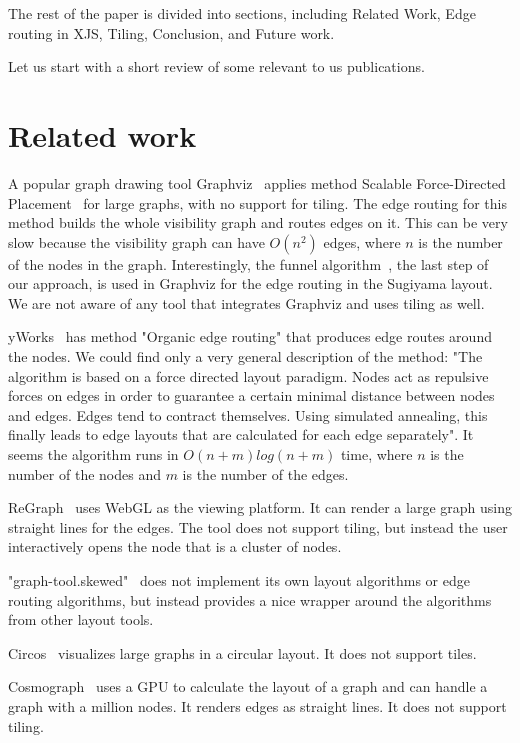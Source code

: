 \documentclass{gd-llncs}
\begin{document}
The rest of the paper is divided into sections, including Related Work, Edge routing in XJS, Tiling, Conclusion, and Future work.

Let us start with a short review of some relevant to us publications.
\section*{Related work}\label{relwork}
A popular graph drawing tool Graphviz~\cite{graphviz} applies method
Scalable Force-Directed Placement~\cite{sfdp} for large graphs, with no
support for tiling. The edge routing for this method builds the whole
visibility graph and routes edges on it. This can be very slow because the visibility graph can have $O(n^2)$ edges, where $n$ is the number of the nodes in the graph.
Interestingly, the funnel algorithm~\cite{chazelle1982theorem,hershberger1994computing},
the last step of our approach, is used in Graphviz for the edge routing in the
Sugiyama layout. We are not aware of any tool that integrates Graphviz
and uses tiling as well.

yWorks~\cite{yworks} has method "Organic edge routing" that produces edge
routes around the nodes. We could find only
a very general description of the method: "The algorithm is based on a force
directed layout paradigm. Nodes act as repulsive forces on edges in order to
guarantee a certain minimal distance between nodes and edges. Edges tend to contract
themselves. Using simulated annealing, this finally leads to edge layouts that
are calculated for each edge separately". It seems the algorithm runs in $O(n+m)log(n+m)$
time, where $n$ is the number of the nodes and $m$ is the number of the edges.

ReGraph~\cite{regraph} uses WebGL as the viewing platform. It can render a large
graph using straight lines for the edges. The tool does not support tiling, but instead
the user interactively opens the node that is a cluster of nodes.

"graph-tool.skewed"~\cite{skewed} does not implement its own layout algorithms or
edge routing algorithms, but instead provides a nice wrapper around the algorithms from
other layout tools.

Circos~\cite{circos} visualizes large graphs in a circular layout. It does not support tiles.


Cosmograph~\cite{cosmograph} uses a GPU to calculate the layout of a graph and can
handle a graph with a million nodes. It renders edges as straight lines.
It does not support tiling.
\end{document}
